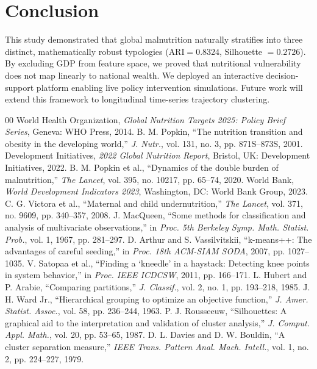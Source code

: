\documentclass[conference]{IEEEtran}
\begin{document}
\section{Conclusion}
This study demonstrated that global malnutrition naturally stratifies into three distinct, mathematically robust typologies ($\text{ARI} = 0.8324$, Silhouette $= 0.2726$). By excluding GDP from feature space, we proved that nutritional vulnerability does not map linearly to national wealth. We deployed an interactive decision-support platform enabling live policy intervention simulations. Future work will extend this framework to longitudinal time-series trajectory clustering.

\begin{thebibliography}{00}
 World Health Organization, \textit{Global Nutrition Targets 2025: Policy Brief Series}, Geneva: WHO Press, 2014.
 B. M. Popkin, ``The nutrition transition and obesity in the developing world,'' \textit{J. Nutr.}, vol. 131, no. 3, pp. 871S--873S, 2001.
 Development Initiatives, \textit{2022 Global Nutrition Report}, Bristol, UK: Development Initiatives, 2022.
 B. M. Popkin et al., ``Dynamics of the double burden of malnutrition,'' \textit{The Lancet}, vol. 395, no. 10217, pp. 65--74, 2020.
 World Bank, \textit{World Development Indicators 2023}, Washington, DC: World Bank Group, 2023.
 C. G. Victora et al., ``Maternal and child undernutrition,'' \textit{The Lancet}, vol. 371, no. 9609, pp. 340--357, 2008.
 J. MacQueen, ``Some methods for classification and analysis of multivariate observations,'' in \textit{Proc. 5th Berkeley Symp. Math. Statist. Prob.}, vol. 1, 1967, pp. 281--297.
 D. Arthur and S. Vassilvitskii, ``k-means++: The advantages of careful seeding,'' in \textit{Proc. 18th ACM-SIAM SODA}, 2007, pp. 1027--1035.
 V. Satopaa et al., ``Finding a `kneedle' in a haystack: Detecting knee points in system behavior,'' in \textit{Proc. IEEE ICDCSW}, 2011, pp. 166--171.
 L. Hubert and P. Arabie, ``Comparing partitions,'' \textit{J. Classif.}, vol. 2, no. 1, pp. 193--218, 1985.
 J. H. Ward Jr., ``Hierarchical grouping to optimize an objective function,'' \textit{J. Amer. Statist. Assoc.}, vol. 58, pp. 236--244, 1963.
 P. J. Rousseeuw, ``Silhouettes: A graphical aid to the interpretation and validation of cluster analysis,'' \textit{J. Comput. Appl. Math.}, vol. 20, pp. 53--65, 1987.
 D. L. Davies and D. W. Bouldin, ``A cluster separation measure,'' \textit{IEEE Trans. Pattern Anal. Mach. Intell.}, vol. 1, no. 2, pp. 224--227, 1979.
\end{thebibliography}
\end{document}
